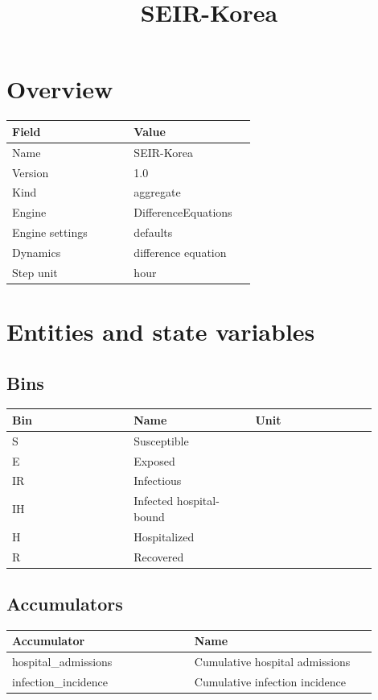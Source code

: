 \documentclass{article}
\title{SEIR-Korea}
\date{}
\begin{document}
\maketitle
\section*{Overview}
\begin{longtable}{p{0.45\linewidth}p{0.45\linewidth}}
Field & Value \\
\hline
\endhead
Name & SEIR-Korea \\
Version & 1.0 \\
Kind & aggregate \\
Engine & DifferenceEquations \\
Engine settings & defaults \\
Dynamics & difference equation \\
Step unit & hour \\
\end{longtable}
\section*{Entities and state variables}
\subsection*{Bins}
\begin{longtable}{p{0.3\linewidth}p{0.3\linewidth}p{0.3\linewidth}}
Bin & Name & Unit \\
\hline
\endhead
S & Susceptible &  \\
E & Exposed &  \\
IR & Infectious &  \\
IH & Infected hospital-bound &  \\
H & Hospitalized &  \\
R & Recovered &  \\
\end{longtable}
\subsection*{Accumulators}
\begin{longtable}{p{0.45\linewidth}p{0.45\linewidth}}
Accumulator & Name \\
\hline
\endhead
hospital\_admissions & Cumulative hospital admissions \\
infection\_incidence & Cumulative infection incidence \\
\end{longtable}
\end{document}
